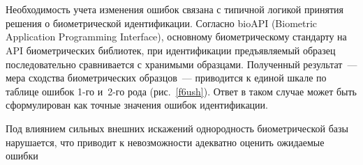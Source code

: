 \begin{multicols}{2}
\begin{figure*} %
\vspace*{1pt}
\begin{center}
\vspace*{1pt}
\mbox{%
\epsfxsize=165.791mm
}
\end{center}
\vspace*{-9pt}
     \vspace*{18pt}
\begin{center}
\vspace*{1pt}
\mbox{%
\epsfxsize=151.739mm
}
\end{center}
\vspace*{-9pt}
\end{figure*}

     
     Необходимость учета изменения ошибок связана с типичной логикой принятия 
решения о био\-мет\-ри\-ческой идентификации. Согласно bioAPI (Biometric Application Programming Interface), основному 
био\-мет\-ри\-че\-скому стандарту на API био\-мет\-ри\-ческих библиотек, при идентификации 
предъявляемый образец последовательно сравнивается с хранимыми образцами. 
Полученный результат~--- мера сходства био\-мет\-ри\-ческих образцов~--- приводится к 
единой шкале по таблице ошибок 1-го и~2-го рода (рис.~\ref{f6ush}). Ответ в таком 
случае может быть сформулирован как точные значения ошибок идентификации.
     
     Под влиянием сильных внешних искажений однородность биометрической базы 
нарушается, что приводит к невозможности адекватно оценить ожидаемые ошибки 
\begin{table*}[b]\small %
\begin{center}
\vspace*{2ex}


\end{center}
\end{table*}
\end{multicols}
